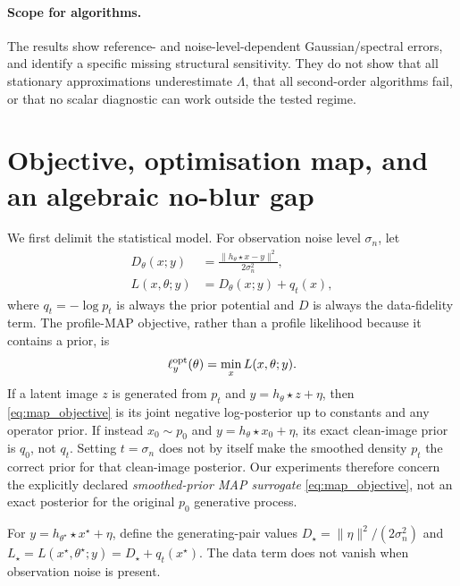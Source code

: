 \documentclass[10pt,journal]{IEEEtran}
\newcommand{\blur}{\star}
\newcommand{\Lam}{\Lambda}
\begin{document}
\paragraph*{Scope for algorithms.}
The results show reference- and noise-level-dependent Gaussian/spectral errors, and identify a
specific missing structural sensitivity. They do not show that all stationary approximations
underestimate $\Lam$, that all second-order algorithms fail, or that no scalar diagnostic can
work outside the tested regime.

\section{Objective, optimisation map, and an algebraic no-blur gap}
\label{sec:map}

We first delimit the statistical model. For observation noise level $\sigma_n$, let
\begin{equation}
  \begin{aligned}
  D_\theta(x;y)&=\frac{\|h_\theta\blur x-y\|^2}{2\sigma_n^2},\\
  L(x,\theta;y)&=D_\theta(x;y)+q_t(x),
  \end{aligned}
  \label{eq:map_objective}
\end{equation}
where $q_t=-\log p_t$ is always the prior potential and $D$ is always the data-fidelity term.
The profile-MAP objective, rather than a profile likelihood because it contains a prior, is
\begin{equation}
  \ell_y^{\rm opt}(\theta)=\min_x L(x,\theta;y).
  \label{eq:profile}
\end{equation}
If a latent image $z$ is generated from $p_t$ and $y=h_\theta\blur z+\eta$, then
\eqref{eq:map_objective} is its joint negative log-posterior up to constants and any operator
prior. If instead $x_0\sim p_0$ and $y=h_\theta\blur x_0+\eta$, its exact clean-image prior is
$q_0$, not $q_t$. Setting $t=\sigma_n$ does not by itself make the smoothed density $p_t$ the
correct prior for that clean-image posterior. Our experiments therefore concern the explicitly
declared \emph{smoothed-prior MAP surrogate} \eqref{eq:map_objective}, not an exact posterior
for the original $p_0$ generative process.

For $y=h_{\theta^\blur}\blur x^\star+\eta$, define the generating-pair values
$D_\star=\|\eta\|^2/(2\sigma_n^2)$ and
$L_\star=L(x^\star,\theta^\blur;y)=D_\star+q_t(x^\star)$. The data term does not vanish when
observation noise is present.
\end{document}
